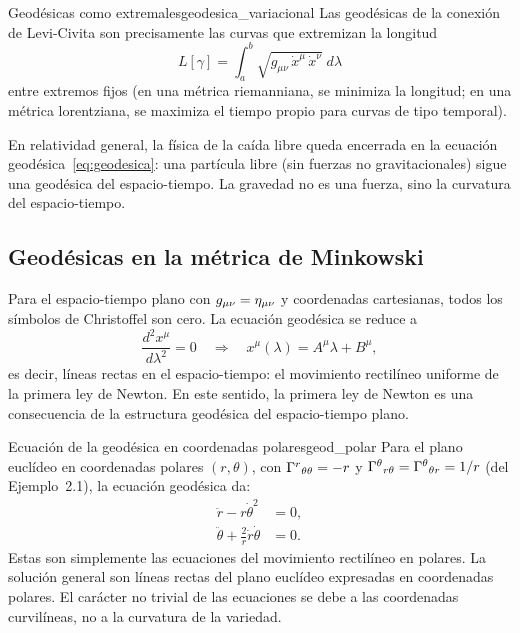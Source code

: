 \begin{teorema}{Geodésicas como extremales}{geodesica_variacional}
Las geodésicas de la conexión de Levi-Civita son precisamente las curvas que extremizan la longitud
\[
  L[\gamma] = \int_a^b \sqrt{g_{\mu\nu}\, \dot{x}^\mu\, \dot{x}^\nu}\; d\lambda
\]
entre extremos fijos (en una métrica riemanniana, se minimiza la longitud; en una métrica lorentziana, se maximiza el tiempo propio para curvas de tipo temporal).
\end{teorema}

En relatividad general, la física de la caída libre queda encerrada en la ecuación geodésica~\eqref{eq:geodesica}: una partícula libre (sin fuerzas no gravitacionales) sigue una geodésica del espacio-tiempo. La gravedad no es una fuerza, sino la curvatura del espacio-tiempo.

\subsection{Geodésicas en la métrica de Minkowski}

Para el espacio-tiempo plano con $g_{\mu\nu} = \eta_{\mu\nu}$ y coordenadas cartesianas, todos los símbolos de Christoffel son cero. La ecuación geodésica se reduce a
\[
  \frac{d^2 x^\mu}{d\lambda^2} = 0 \quad \Longrightarrow \quad x^\mu(\lambda) = A^\mu \lambda + B^\mu,
\]
es decir, líneas rectas en el espacio-tiempo: el movimiento rectilíneo uniforme de la primera ley de Newton. En este sentido, la primera ley de Newton es una consecuencia de la estructura geodésica del espacio-tiempo plano.

\begin{ejemplo}{Ecuación de la geodésica en coordenadas polares}{geod_polar}
Para el plano euclídeo en coordenadas polares $(r,\theta)$, con $\Gamma^{r}{}_{\theta \theta} = -r$ y $\Gamma^{\theta}{}_{r \theta} = \Gamma^{\theta}{}_{\theta r} = 1/r$ (del Ejemplo~2.1), la ecuación geodésica da:
\begin{align}
  \ddot{r} - r\dot{\theta}^2 &= 0, \label{eq:geod_r}\\
  \ddot{\theta} + \frac{2}{r}\dot{r}\dot{\theta} &= 0. \label{eq:geod_theta}
\end{align}
Estas son simplemente las ecuaciones del movimiento rectilíneo en polares. La solución general son líneas rectas del plano euclídeo expresadas en coordenadas polares. El carácter no trivial de las ecuaciones se debe a las coordenadas curvilíneas, no a la curvatura de la variedad.
\end{ejemplo}

